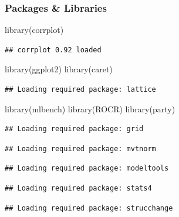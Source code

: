 \documentclass[
]{article}
\author{}
\date{\vspace{-2.5em}}
\newenvironment{Shaded}{\begin{snugshade}}{\end{snugshade}}
\newcommand{\FunctionTok}[1]{\textcolor[rgb]{0.00,0.00,0.00}{#1}}
\newcommand{\NormalTok}[1]{#1}
\begin{document}
\hypertarget{packages-libraries}{%
\subsubsection{Packages \& Libraries}\label{packages-libraries}}

\begin{Shaded}
\begin{Highlighting}[]
\FunctionTok{library}\NormalTok{(corrplot)}
\end{Highlighting}
\end{Shaded}

\begin{verbatim}
## corrplot 0.92 loaded
\end{verbatim}

\begin{Shaded}
\begin{Highlighting}[]
\FunctionTok{library}\NormalTok{(ggplot2)}
\FunctionTok{library}\NormalTok{(caret)}
\end{Highlighting}
\end{Shaded}

\begin{verbatim}
## Loading required package: lattice
\end{verbatim}

\begin{Shaded}
\begin{Highlighting}[]
\FunctionTok{library}\NormalTok{(mlbench)}
\FunctionTok{library}\NormalTok{(ROCR)}
\FunctionTok{library}\NormalTok{(party)}
\end{Highlighting}
\end{Shaded}

\begin{verbatim}
## Loading required package: grid
\end{verbatim}

\begin{verbatim}
## Loading required package: mvtnorm
\end{verbatim}

\begin{verbatim}
## Loading required package: modeltools
\end{verbatim}

\begin{verbatim}
## Loading required package: stats4
\end{verbatim}

\begin{verbatim}
## Loading required package: strucchange
\end{verbatim}
\end{document}
